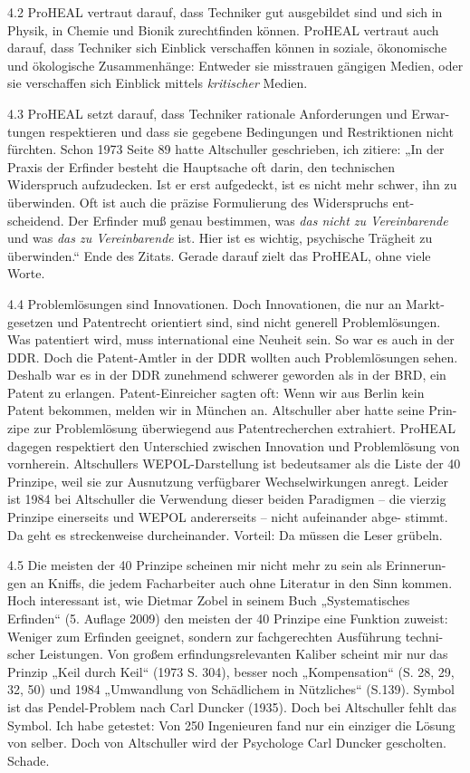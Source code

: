 \documentclass[12pt,a4paper]{article}
\begin{document}
4.2 ProHEAL vertraut darauf, dass Techniker gut ausgebildet sind und sich in
Physik, in Chemie und Bionik zurechtfinden können. ProHEAL vertraut auch
darauf, dass Techniker sich Einblick verschaffen können in soziale,
ökonomische und ökologische Zusammenhänge: Entweder sie misstrauen gängigen
Medien, oder sie verschaffen sich Einblick mittels \emph{kritischer} Medien.

4.3 ProHEAL setzt darauf, dass Techniker rationale Anforderungen und Erwar-
tungen respektieren und dass sie gegebene Bedingungen und Restriktionen nicht
fürchten. Schon 1973 Seite 89 hatte Altschuller geschrieben, ich zitiere: „In
der Praxis der Erfinder besteht die Hauptsache oft darin, den technischen
Widerspruch aufzudecken. Ist er erst aufgedeckt, ist es nicht mehr schwer, ihn
zu überwinden. Oft ist auch die präzise Formulierung des Widerspruchs ent-
scheidend. Der Erfinder muß genau bestimmen, was \emph{das nicht zu
  Vereinbarende} und was \emph{das zu Vereinbarende} ist. Hier ist es wichtig,
psychische Trägheit zu überwinden.“ Ende des Zitats. Gerade darauf zielt das
ProHEAL, ohne viele Worte.

4.4 Problemlösungen sind Innovationen. Doch Innovationen, die nur an Markt-
gesetzen und Patentrecht orientiert sind, sind nicht generell Problemlösungen.
Was patentiert wird, muss international eine Neuheit sein. So war es auch in
der DDR. Doch die Patent-Amtler in der DDR wollten auch Problemlösungen sehen.
Deshalb war es in der DDR zunehmend schwerer geworden als in der BRD, ein
Patent zu erlangen. Patent-Einreicher sagten oft: Wenn wir aus Berlin kein
Patent bekommen, melden wir in München an. Altschuller aber hatte seine Prin-
zipe zur Problemlösung überwiegend aus Patentrecherchen extrahiert. ProHEAL
dagegen respektiert den Unterschied zwischen Innovation und Problemlösung von
vornherein. Altschullers WEPOL-Darstellung ist bedeutsamer als die Liste der
40 Prinzipe, weil sie zur Ausnutzung verfügbarer Wechselwirkungen anregt.
Leider ist 1984 bei Altschuller die Verwendung dieser beiden Paradigmen – die
vierzig Prinzipe einerseits und WEPOL andererseits – nicht aufeinander abge-
stimmt. Da geht es streckenweise durcheinander. Vorteil: Da müssen die Leser
grübeln.

4.5 Die meisten der 40 Prinzipe scheinen mir nicht mehr zu sein als Erinnerun-
gen an Kniffs, die jedem Facharbeiter auch ohne Literatur in den Sinn kommen.
Hoch interessant ist, wie Dietmar Zobel in seinem Buch „Systematisches
Erfinden“ (5. Auflage 2009) den meisten der 40 Prinzipe eine Funktion zuweist:
Weniger zum Erfinden geeignet, sondern zur fachgerechten Ausführung techni-
scher Leistungen. Von großem erfindungsrelevanten Kaliber scheint mir nur das
Prinzip „Keil durch Keil“ (1973 S. 304), besser noch „Kompensation“ (S. 28,
29, 32, 50) und 1984 „Umwandlung von Schädlichem in Nützliches“
(S.139). Symbol ist das Pendel-Problem nach Carl Duncker (1935). Doch bei
Altschuller fehlt das Symbol. Ich habe getestet: Von 250 Ingenieuren fand nur
ein einziger die Lösung von selber. Doch von Altschuller wird der Psychologe
Carl Duncker gescholten. Schade.
\end{document}
